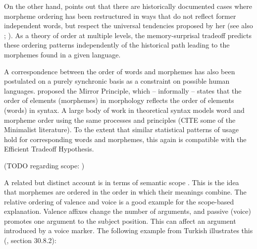 \documentclass[11pt,letterpaper]{article}
\newcommand\mhahn[1]{{\color{red}(#1)}}
\begin{document}

On the other hand, \citet{bybee-morphology-1985} points out that there are historically documented cases where morpheme ordering has been restructured in ways that do not reflect former independent words, but respect the universal tendencies proposed by her (see also \citet{mithun2000the, haspelmath1993the, mithun1995affixation}; \citet[Section 15]{rice2000morpheme}).
As a theory of order at multiple levels, the memory-surprisal tradeoff predicts these ordering patterns independently of the historical path leading to the morphemes found in a given language.

A correspondence between the order of words and morphemes has also been postulated on a purely synchronic basis as a constraint on possible human languages.
\cite{baker1985the} proposed the Mirror Principle, which -- informally -- states that the order of elements (morphemes) in morphology reflects the order of elements (words) in syntax.
A large body of work in theoretical syntax models word and morpheme order using the same processes and principles (CITE some of the Minimalist literature).
To the extent that similar statistical patterns of usage hold for corresponding words and morphemes, this again is compatible with the Efficient Tradeoff Hypothesis.

\mhahn{TODO regarding scope: \citep{baker1988incorporation,foley1984functional,chierchia1990meaning,valin1992a}}





A related but distinct account is in terms of semantic scope \citep{rice2000morpheme}.
This is the idea that morphemes are ordered in the order in which their meanings combine.
The relative ordering of valence and voice is a good example for the scope-based explanation.
Valence affixes change the number of arguments, and passive (voice) promotes one argument to the subject position.
This can affect an argument introduced by a voice marker.
The following example from Turkish illustrates this (\cite{schaaik2020turkish}, section 30.8.2):
\end{document}
